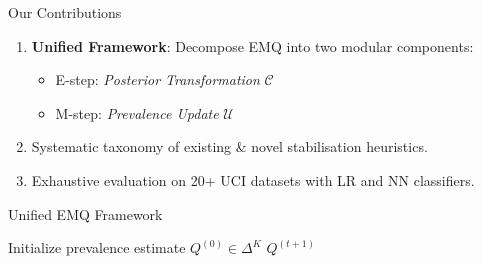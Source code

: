 \documentclass[aspectratio=169]{beamer}
\begin{document}
\begin{frame}{Our Contributions}
  \begin{enumerate}
    \item \textbf{Unified Framework}: Decompose EMQ into two modular components:
          \begin{itemize}
            \item E-step: \textit{Posterior Transformation} $\mathcal{C}$
            \item M-step: \textit{Prevalence Update} $\mathcal{U}$
          \end{itemize}
    \item Systematic taxonomy of existing \& novel stabilisation heuristics.
    \item Exhaustive evaluation on 20+ UCI datasets with LR and NN classifiers.
  \end{enumerate}
\end{frame}

\begin{frame}[fragile]{Unified EMQ Framework}
\fontsize{8.5}{8.5}\selectfont
\begin{algorithm}[H]
\DontPrintSemicolon
\SetAlgoNoLine %
\SetNlSty{}{\color{gray}}{} %
Initialize prevalence estimate $Q^{(0)} \in \Delta^K$\;
\Return $Q^{(t+1)}$\;
\caption{Unified EMQ Framework}
\end{algorithm}
\end{frame}
\end{document}
